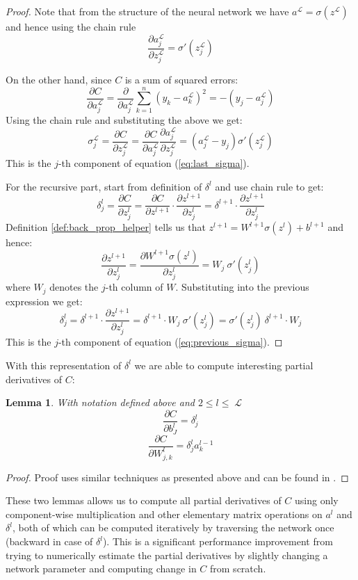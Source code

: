 \documentclass[a4paper]{article}
\theoremstyle{break}
\newtheorem{lemma}[theorem]{Lemma}
\newcommand{\Part}[2]{\frac{\partial #1}{\partial #2}}
\DeclareMathOperator{\La}{\mathcal{L}}
\begin{document}
\begin{proof}
    Note that from the structure of the neural network we have
    $a^{\La} = \sigma(z^{\La})$ and hence using the chain rule
    $$ \Part{a_j^{\La}}{z_j^{\La}} = \sigma' (z_j^{\La}) $$
    
    On the other hand, since $C$ is a sum of squared errors:
    $$ \Part{C}{a_j^{\La}} = \Part{}{a_j^{\La}} \sum_{k=1}^n (y_k - a_k^{\La})^2 = - (y_j - a_j^{\La})$$
    Using the chain rule and substituting the above we get:
    $$ \sigma_j^{\La} = \Part{C}{z_j^{\La}} = \Part{C}{a_j^{\La}} \Part{a_j^{\La}}{z_j^{\La}} = (a_j^{\La} - y_j) \sigma' (z_j^{\La})$$
    This is the $j$-th component of equation (\ref{eq:last_sigma}).
    
    For the recursive part, start from definition of $\delta^l$ and use chain rule to get:
    $$ \delta^l_j = \Part{C}{z_j^l} =
       \Part{C}{z^{l+1}} \cdot \Part{z^{l+1}}{z_j^l} = 
       \delta^{l+1}      \cdot \Part{z^{l+1}}{z_j^l} $$
    Definition \ref{def:back_prop_helper} tells us that
    $ z^{l+1} = W^{l+1} \sigma(z^{l}) + b^{l+1} $
    and hence:
    $$  \Part{z^{l+1}}{z^l_j} =
        \Part{W^{l+1} \sigma(z^l)}{z_j^l} = W_{j} ~ \sigma'(z_j^l)$$
    where $W_{j}$ denotes the $j$-th column of $W$. Substituting into the previous expression we get:
    $$ \delta^l_j = \delta^{l+1} \cdot \Part{z^{l+1}}{z_j^l}
     = \delta^{l+1} \cdot W_{j} ~ \sigma'(z_j^l) = \sigma'(z_j^l) ~ \delta^{l+1} \cdot W_{j}$$
    This is the $j$-th component of equation (\ref{eq:previous_sigma}).
\end{proof}

With this representation of $\delta^l$ we are able to compute interesting partial derivatives of $C$:
\begin{lemma}
    With notation defined above and $ 2 \leq l \leq \La$
     $$ \Part{C}{b_J^l} = \delta_j^l $$
     $$ \Part{C}{W^l_{j, k}} = \delta^l_j a_k^{l-1} $$
\end{lemma}
\begin{proof}
    Proof uses similar techniques as presented above and can be found in \cite[p14]{higham}.
\end{proof}

These two lemmas allows us to compute all partial derivatives of $C$ using only component-wise multiplication and other elementary matrix operations on $a^l$ and $\delta^l$, both of which can be computed iteratively by traversing the network once (backward in case of $\delta^l$). This is a significant performance improvement from trying to numerically estimate the partial derivatives by slightly changing a network parameter and computing change in $C$ from scratch.


\printbibliography
\end{document}
